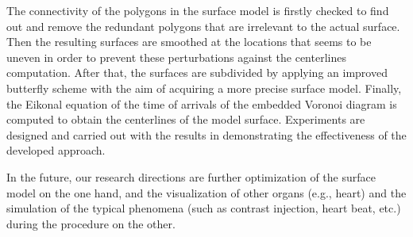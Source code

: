 The connectivity of the polygons in the surface model is firstly checked to find out and remove the redundant polygons that are irrelevant to the actual surface.
Then the resulting surfaces are smoothed at the locations that seems to be uneven in order to prevent these perturbations against the centerlines computation.
After that, the surfaces are subdivided by applying an improved butterfly scheme with the aim of acquiring a more precise surface model.
Finally, the Eikonal equation of the time of arrivals of the embedded Voronoi diagram is computed to obtain the centerlines of the model surface.
Experiments are designed and carried out with the results in demonstrating the effectiveness of the developed approach.

In the future, our research directions are further optimization of the surface model on the one hand, and the visualization of other organs (e.g., heart) and the simulation of the typical phenomena (such as contrast injection, heart beat, etc.) during the procedure on the other. %
